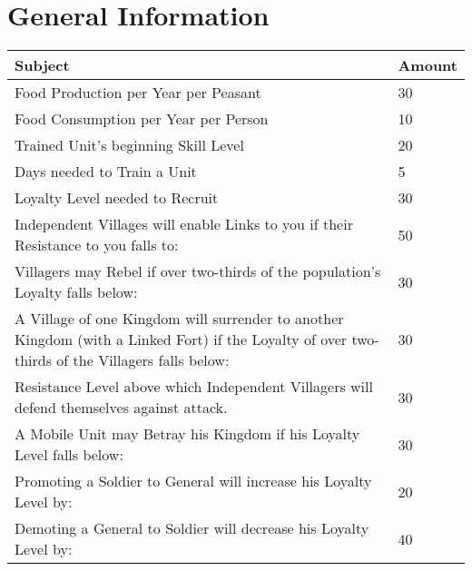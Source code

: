 \section{General Information}

\begin{tabular}{ | p{5cm} | p{5cm} |}
	\hline
	Subject	& Amount \\ \hline
Food Production per Year per Peasant	& 30 \\ \hline
Food Consumption per Year per Person	& 10 \\ \hline
Trained Unit’s beginning Skill Level	& 20 \\ \hline
Days needed to Train a Unit	& 5 \\ \hline
Loyalty Level needed to Recruit	& 30 \\ \hline
Independent Villages will enable Links to you if their Resistance to you falls to:	& 50 \\ \hline
Villagers may Rebel if over two-thirds of the population’s Loyalty falls below:	& 30 \\ \hline
A Village of one Kingdom will surrender to another Kingdom (with a Linked Fort) if the Loyalty of over two-thirds of the Villagers falls below:	& 30 \\ \hline
Resistance Level above which Independent Villagers will defend themselves against attack.	& 30 \\ \hline
A Mobile Unit may Betray his Kingdom if his Loyalty Level falls below:	& 30 \\ \hline
Promoting a Soldier to General will increase his Loyalty Level by:	& 20 \\ \hline
Demoting a General to Soldier will decrease his Loyalty Level by:	& 40 \\ \hline
\hline
\end{tabular}